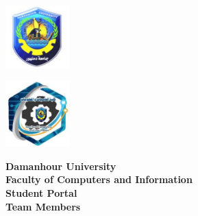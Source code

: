 \documentclass[12pt]{report}
\begin{document}

\begin{titlepage}
    \thispagestyle{empty}

    \begin{minipage}{0.49\textwidth}
        \raggedright
        \includegraphics[width=2.5cm]{images/university_logo.png}
    \end{minipage}
    \begin{minipage}{0.49\textwidth}
        \raggedleft
        \includegraphics[width=2.5cm]{images/faculty_logo.png}
    \end{minipage}

    \vspace{2cm}

    \begin{center}
        {\LARGE \textbf{Damanhour University}}\\[0.5em]
        {\Large \textbf{Faculty of Computers and Information}}\\[1.5cm]

        {\Huge \textbf{Student Portal}}\\[1.5cm]

        {\Large \textbf{Team Members}}\\[1em]
        \begin{center}
        \end{center}
        


\end{center}
\end{titlepage}
\end{document}
